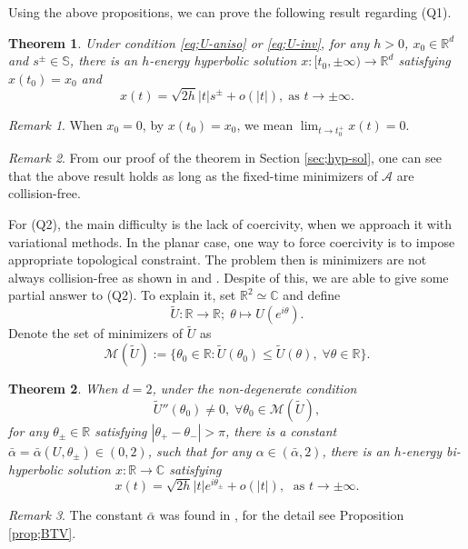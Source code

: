 \documentclass[11pt]{amsart}
\newcommand{\rr}{\mathbb R}
\newcommand{\cc}{\mathbb C}
\newcommand{\A}{\mathcal A}
\newcommand{\bs}{\mathbb S}
\newcommand{\al}{\alpha}
\newcommand{\tht}{\theta}
\theoremstyle{plain}
\newtheorem{thm}{Theorem}[section]
\theoremstyle{definition}
\theoremstyle{remark}
\newtheorem{rem}{Remark}[section]
\begin{document}
Using the above propositions, we can prove the following result regarding (Q1).

\begin{thm}
\label{thm;hyper} Under condition \eqref{eq;U-aniso} or \eqref{eq;U-inv}, for any $h>0$, $x_0 \in \rr^d$ and $s^{\pm} \in \bs$, there is an $h$-energy hyperbolic solution $x: [t_0, \pm \infty) \to \rr^d$ satisfying $x(t_0) =x_0$ and 
$$ x(t) = \sqrt{2h} |t| s^{\pm} + o(|t|), \; \text{as } t \to \pm \infty. $$  
\end{thm}

\begin{rem}
	When $x_0=0$, by $x(t_0)=x_0$, we mean  $\lim_{t \to t_0^+} x(t) =0$.
\end{rem}

\begin{rem}\label{rem:coll-free} From our proof of the theorem in Section \ref{sec;hyp-sol}, one can see that the above result holds as long as the fixed-time minimizers of $\A$ are collision-free.
\end{rem}
For (Q2), the main difficulty is the lack of coercivity, when we approach it with variational methods. In the planar case, one way to force coercivity is to impose appropriate topological constraint. The problem then is minimizers are not always collision-free as shown in \cite{Gordon77} and \cite{BTV13}. Despite of this, we are able to give some partial answer to (Q2). To explain it, set $\rr^2 \simeq \cc$ and define 
$$ \tilde{U}: \rr \to \rr; \; \tht \mapsto U(e^{i\tht}).$$
Denote the set of minimizers of $\tilde{U}$ as 
\begin{equation} \label{eq;min-U}
\mathcal{M}(\tilde{U}) :=\{ \tht_0 \in \rr: \tilde{U}(\tht_0) \le \tilde{U}(\tht), \; \forall \tht \in \rr \}.
\end{equation}

\begin{thm}
\label{thm;bi-hyper} When $d=2$, under the non-degenerate condition  
\begin{equation} \tag{U3}
\label{eq;U-nondeg}  \tilde{U}''(\tht_0) \ne 0,  \; \forall \tht_0 \in \mathcal{M}(\tilde{U}),
\end{equation}
for any $\tht_{\pm} \in \rr$ satisfying $|\tht_+-\tht_-| >\pi$, there is a constant $\bar{\al} =\bar{\al}(U, \tht_{\pm}) \in (0, 2)$, such that for any $\al \in (\bar{\al}, 2)$, there is an $h$-energy bi-hyperbolic solution $x: \rr \to \cc$ satisfying
$$x(t) = \sqrt{2h} |t| e^{i \tht_{\pm}} + o(|t|), \; \text{ as } t \to \pm \infty.$$
\end{thm}
\begin{rem}
The constant $\bar{\al}$ was found in \cite{BTV13}, for the detail see Proposition \ref{prop;BTV}. 
\end{rem}
 
\end{document}
